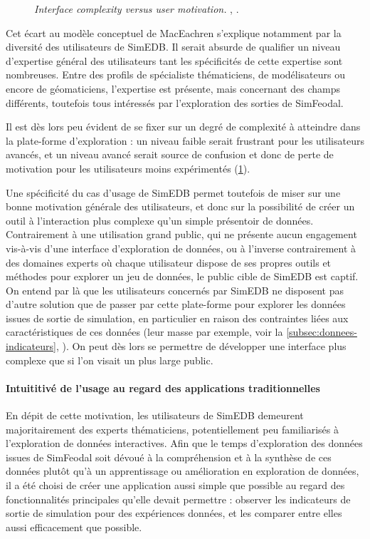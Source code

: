 \begin{figure}[H]
\begin{minipage}[t]{.46\linewidth}
\caption{\og \textit{Interface complexity versus user motivation. }\fg{}, \cite[79]{roth_interactive_2013}.}
\label{fig:interface-complexity}
\end{minipage}
\medskip
\end{figure}

Cet écart au modèle conceptuel de MacEachren s'explique notamment par la diversité des utilisateurs de SimEDB.
Il serait absurde de qualifier un niveau d'expertise général des utilisateurs tant les spécificités de cette expertise sont nombreuses.
Entre des profils de spécialiste thématiciens, de modélisateurs ou encore de géomaticiens, l'expertise est présente, mais concernant des champs différents, toutefois tous intéressés par l'exploration des sorties de SimFeodal.

Il est dès lors peu évident de se fixer sur un degré de complexité à atteindre dans la plate-forme d'exploration : un niveau faible serait frustrant pour les utilisateurs avancés, et un niveau avancé serait source de confusion et donc de perte de motivation pour les utilisateurs moins expérimentés (\cref{fig:interface-complexity}).

Une spécificité du cas d'usage de SimEDB permet toutefois de miser sur une bonne motivation générale des utilisateurs, et donc sur la possibilité de créer un outil à l'interaction plus complexe qu'un simple présentoir de données.
Contrairement à une utilisation grand public, qui ne présente aucun engagement vis-à-vis d'une interface d'exploration de données, ou à l'inverse contrairement à des domaines experts où chaque utilisateur dispose de ses propres outils et méthodes pour explorer un jeu de données, le public cible de SimEDB est \og captif\fg{}.
On entend par là que les utilisateurs concernés par SimEDB ne disposent pas d'autre solution que de passer par cette plate-forme pour explorer les données issues de sortie de simulation, en particulier en raison des contraintes liées aux caractéristiques de ces données (leur masse par exemple, voir la \cref{subsec:donnees-indicateurs}, ).
On peut dès lors se permettre de développer une interface plus complexe que si l'on visait un plus large public.

\paragraph*{Intuititivé de l'usage au regard des applications traditionnelles}

En dépit de cette motivation, les utilisateurs de SimEDB demeurent majoritairement des experts thématiciens, potentiellement peu familiarisés à l'exploration de données interactives.
Afin que le temps d'exploration des données issues de SimFeodal soit dévoué à la compréhension et à la synthèse de ces données plutôt qu'à un apprentissage ou amélioration en exploration de données, il a été choisi de créer une application aussi simple que possible au regard des fonctionnalités principales qu'elle devait permettre : observer les indicateurs de sortie de simulation pour des expériences données, et les comparer entre elles aussi efficacement que possible.

